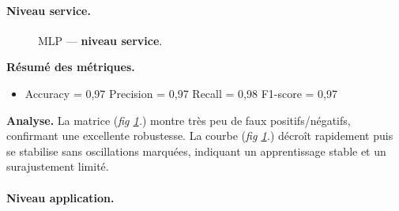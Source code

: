 \documentclass[conference]{IEEEtran}
\begin{document}
\paragraph{Niveau service.}

\begin{figure}[!t]
  \centering
  \hfill%
  \caption{MLP — \textbf{niveau service}.}
  \label{fig:mlp-service}
\end{figure}

\textbf{Résumé des métriques.}
\begin{itemize}
    \item Accuracy = 0{,}97 \quad
          Precision = 0{,}97 \quad
          Recall = 0{,}98 \quad
          F1-score = 0{,}97
\end{itemize}

\textbf{Analyse.}
La matrice (\textit{fig \ref{fig:mlp-service}.}) montre très peu de faux positifs/négatifs, confirmant une excellente robustesse. 
La courbe (\textit{fig \ref{fig:mlp-service}.}) décroît rapidement puis se stabilise sans oscillations marquées, indiquant un apprentissage stable et un surajustement limité.

\paragraph{Niveau application.}
\end{document}
